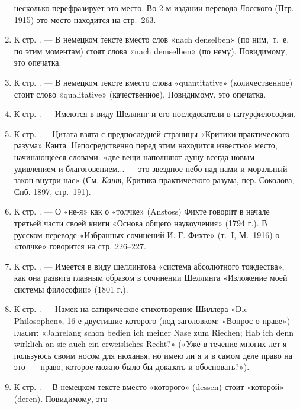 \begin{enumerate}
несколько перефразирует это место. Во 2-м издании перевода Лосского (Пгр.
1915) это место находится на стр.~263.
\item \label{bkm:Ref474665791}К стр. \pageref{bkm:bm39}. — В немецком тексте
вместо слов «nach denselben» (по ним,~т.~е. по этим моментам) стоят слова
«nach demselben» (по нему). Повидимому, это опечатка.
\item \label{bkm:Ref474665796}К стр. \pageref{bkm:bm40}. — В немецком тексте
вместо слова «quantitative» (количественное) стоит слово «qualitative»
(качественное). Повидимому, это опечатка.
\item \label{bkm:Ref474665804}К стр. \pageref{bkm:bm41}. — Имеются в виду
Шеллинг и его последователи в натурфилософии.
\item \label{bkm:Ref474665813}К стр. \pageref{bkm:bm42}. —Цитата взята с
предпоследней страницы «Критики практического разума» Канта.
Непосредственно перед этим находится известное место, начинающееся словами:
«две вещи наполняют душу всегда новым удивлением и благоговением... — это
звездное небо над нами и моральный закон внутри нас» (См. {\em Кант},
Критика практического разума, пер. Соколова, Спб. 1897, стр.~191).
\item \label{bkm:Ref474665836}К стр. \pageref{bkm:bm43}. — О «не-я» как о
«толчке» (Anstoss) Фихте говорит в начале третьей части своей книги «Основа
общего наукоучения» (1794 г.). В русском переводе «Избранных сочинений И.
Г. Фихте» (т.~I, М.~1916) о «толчке» говорится на стр. 226–227.
\item \label{bkm:Ref474665876}К стр. \pageref{bkm:bm44}. — Имеется в виду
шеллингова «система абсолютного тождества», как она развита главным образом
в сочинении Шеллинга «Изложение моей системы философии» (1801 г.).
\item \label{bkm:Ref474665904}К стр. \pageref{bkm:bm45}. — Намек на
сатирическое стихотворение Шиллера «Die Philosophen», 16-е двустишие
которого (под заголовком: «Вопрос о праве») гласит:\newline
«Jahrelang schon bedien ich meiner Nase zum Riechen;\newline
Hab ich denn wirklich an sie auch ein erweisliches Recht?»\newline
(«Уже в течение многих лет я пользуюсь своим носом для нюханья, но имею ли я
и в самом деле право на это —~право, которое можно было бы доказать и
обосновать?»).
\item \label{bkm:Ref474665953}К стр. \pageref{bkm:bm46}. —В немецком тексте
вместо «которого» (dessen) стоит «которой» (deren). Повидимому, это

\end{enumerate}
